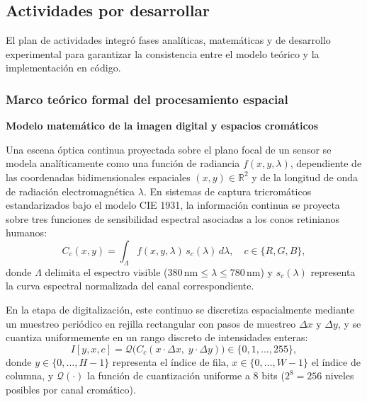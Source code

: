 \documentclass[11pt]{article}
\begin{document}
\subsection{Actividades por desarrollar}
El plan de actividades integró fases analíticas, matemáticas y de desarrollo experimental para garantizar la consistencia entre el modelo teórico y la implementación en código.

\subsubsection{Marco teórico formal del procesamiento espacial}

\textbf{Modelo matemático de la imagen digital y espacios cromáticos}

Una escena óptica continua proyectada sobre el plano focal de un sensor se modela analíticamente como una función de radiancia $f(x, y, \lambda)$, dependiente de las coordenadas bidimensionales espaciales $(x, y) \in \mathbb{R}^2$ y de la longitud de onda de radiación electromagnética $\lambda$. En sistemas de captura tricromáticos estandarizados bajo el modelo CIE 1931, la información continua se proyecta sobre tres funciones de sensibilidad espectral asociadas a los conos retinianos humanos:
\begin{equation}
C_c(x, y) = \int_{\Lambda} f(x, y, \lambda) \, s_c(\lambda) \, d\lambda, \quad c \in \{R, G, B\},
\end{equation}
donde $\Lambda$ delimita el espectro visible ($380\,\text{nm} \le \lambda \le 780\,\text{nm}$) y $s_c(\lambda)$ representa la curva espectral normalizada del canal correspondiente.

En la etapa de digitalización, este continuo se discretiza espacialmente mediante un muestreo periódico en rejilla rectangular con pasos de muestreo $\Delta x$ y $\Delta y$, y se cuantiza uniformemente en un rango discreto de intensidades enteras:
\begin{equation}
I[y, x, c] = \mathcal{Q}\Big( C_c(x \cdot \Delta x, \; y \cdot \Delta y) \Big) \in \{0, 1, \ldots, 255\},
\end{equation}
donde $y \in \{0, \ldots, H-1\}$ representa el índice de fila, $x \in \{0, \ldots, W-1\}$ el índice de columna, y $\mathcal{Q}(\cdot)$ la función de cuantización uniforme a 8 bits ($2^8 = 256$ niveles posibles por canal cromático). 
\end{document}
